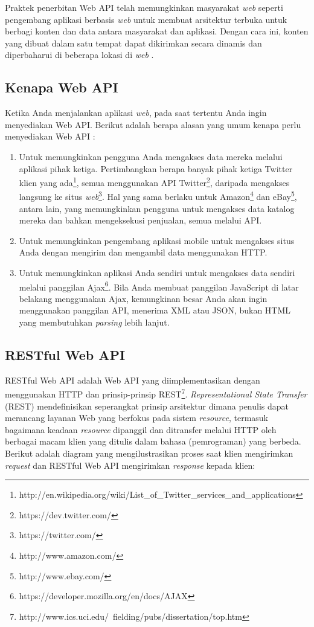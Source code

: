 \documentclass[a4paper, 12pt, oneside]{report}
\begin{document}
\onehalfspacing Praktek penerbitan Web API telah memungkinkan masyarakat \textit{web} seperti \newline pengembang aplikasi berbasis \textit{web} untuk membuat arsitektur terbuka untuk berbagi konten dan data antara masyarakat dan aplikasi. Dengan cara ini, konten yang dibuat dalam satu tempat dapat dikirimkan secara dinamis dan diperbaharui di beberapa lokasi di \textit{web} \cite{api-wikipedia}.

\subsection{Kenapa Web API}
Ketika Anda menjalankan aplikasi \textit{web}, pada saat tertentu Anda ingin menyediakan Web API. Berikut adalah berapa alasan yang umum kenapa perlu menyediakan Web API \cite{apis-linux-journal}:

\begin{enumerate}
  \item Untuk memungkinkan pengguna Anda mengakses data mereka melalui aplikasi pihak ketiga. Pertimbangkan berapa banyak pihak ketiga Twitter klien yang ada\footnote{http://en.wikipedia.org/wiki/List\_of\_Twitter\_services\_and\_applications}, semua menggunakan API Twitter\footnote{https://dev.twitter.com/}, daripada mengakses langsung ke situs \textit{web}\footnote{https://twitter.com/}. Hal yang sama berlaku untuk Amazon\footnote{http://www.amazon.com/} dan eBay\footnote{http://www.ebay.com/}, antara lain, yang memungkinkan pengguna untuk mengakses data katalog mereka dan bahkan mengeksekusi penjualan, semua melalui API.
  \item Untuk memungkinkan pengembang aplikasi mobile untuk mengakses situs Anda dengan mengirim dan mengambil data menggunakan HTTP.
  \item Untuk memungkinkan aplikasi Anda sendiri untuk mengakses data sendiri melalui panggilan Ajax\footnote{https://developer.mozilla.org/en/docs/AJAX}. Bila Anda membuat panggilan JavaScript di latar belakang menggunakan Ajax, kemungkinan besar Anda akan ingin menggunakan panggilan API, menerima XML atau JSON, bukan HTML yang membutuhkan \textit{parsing} lebih lanjut.
\end{enumerate}

\subsection{RESTful Web API}

\onehalfspacing RESTful Web API adalah Web API yang diimplementasikan dengan menggunakan HTTP dan prinsip-prinsip REST\footnote{http://www.ics.uci.edu/~fielding/pubs/dissertation/top.htm}. \textit{Representational State Transfer} (REST) mendefinisikan seperangkat prinsip arsitektur dimana penulis dapat merancang layanan Web yang berfokus pada sistem \textit{resource}, termasuk bagaimana keadaan \textit{resource} dipanggil dan ditransfer melalui HTTP oleh berbagai macam klien yang ditulis dalam bahasa (pemrograman) yang berbeda. Berikut adalah diagram yang mengilustrasikan proses saat klien mengirimkan \textit{request} dan RESTful Web API mengirimkan \textit{response} kepada klien:
\end{document}
